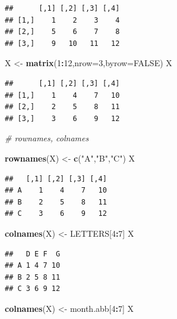 \documentclass[]{book}
\newenvironment{Shaded}{\begin{snugshade}}{\end{snugshade}}
\newcommand{\KeywordTok}[1]{\textcolor[rgb]{0.13,0.29,0.53}{\textbf{#1}}}
\newcommand{\DataTypeTok}[1]{\textcolor[rgb]{0.13,0.29,0.53}{#1}}
\newcommand{\DecValTok}[1]{\textcolor[rgb]{0.00,0.00,0.81}{#1}}
\newcommand{\StringTok}[1]{\textcolor[rgb]{0.31,0.60,0.02}{#1}}
\newcommand{\CommentTok}[1]{\textcolor[rgb]{0.56,0.35,0.01}{\textit{#1}}}
\newcommand{\OtherTok}[1]{\textcolor[rgb]{0.56,0.35,0.01}{#1}}
\newcommand{\OperatorTok}[1]{\textcolor[rgb]{0.81,0.36,0.00}{\textbf{#1}}}
\newcommand{\NormalTok}[1]{#1}
\begin{document}
\begin{verbatim}
##      [,1] [,2] [,3] [,4]
## [1,]    1    2    3    4
## [2,]    5    6    7    8
## [3,]    9   10   11   12
\end{verbatim}

\begin{Shaded}
\begin{Highlighting}[]
\NormalTok{X <-}\StringTok{ }\KeywordTok{matrix}\NormalTok{(}\DecValTok{1}\OperatorTok{:}\DecValTok{12}\NormalTok{,}\DataTypeTok{nrow=}\DecValTok{3}\NormalTok{,}\DataTypeTok{byrow=}\OtherTok{FALSE}\NormalTok{)}
\NormalTok{X}
\end{Highlighting}
\end{Shaded}

\begin{verbatim}
##      [,1] [,2] [,3] [,4]
## [1,]    1    4    7   10
## [2,]    2    5    8   11
## [3,]    3    6    9   12
\end{verbatim}

\begin{Shaded}
\begin{Highlighting}[]
\CommentTok{# rownames, colnames}

\KeywordTok{rownames}\NormalTok{(X) <-}\StringTok{ }\KeywordTok{c}\NormalTok{(}\StringTok{"A"}\NormalTok{,}\StringTok{"B"}\NormalTok{,}\StringTok{"C"}\NormalTok{)}
\NormalTok{X}
\end{Highlighting}
\end{Shaded}

\begin{verbatim}
##   [,1] [,2] [,3] [,4]
## A    1    4    7   10
## B    2    5    8   11
## C    3    6    9   12
\end{verbatim}

\begin{Shaded}
\begin{Highlighting}[]
\KeywordTok{colnames}\NormalTok{(X) <-}\StringTok{ }\NormalTok{LETTERS[}\DecValTok{4}\OperatorTok{:}\DecValTok{7}\NormalTok{]}
\NormalTok{X}
\end{Highlighting}
\end{Shaded}

\begin{verbatim}
##   D E F  G
## A 1 4 7 10
## B 2 5 8 11
## C 3 6 9 12
\end{verbatim}

\begin{Shaded}
\begin{Highlighting}[]
\KeywordTok{colnames}\NormalTok{(X) <-}\StringTok{ }\NormalTok{month.abb[}\DecValTok{4}\OperatorTok{:}\DecValTok{7}\NormalTok{]}
\NormalTok{X}
\end{Highlighting}
\end{Shaded}
\end{document}
